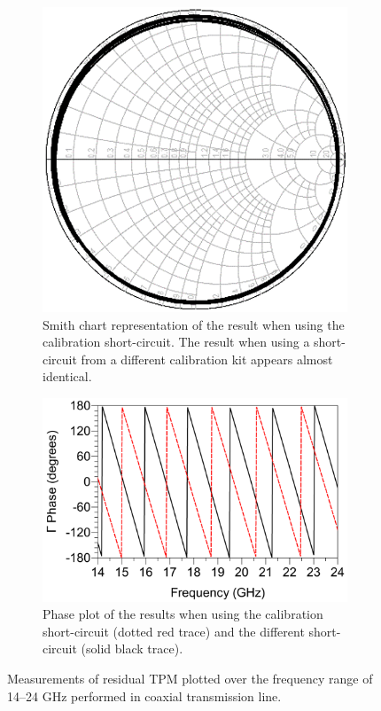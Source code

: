 \documentclass[../thesis/thesis.tex]{subfiles}
\begin{document}
\begin{figure}
	\centering
	\begin{subfigure}{0.37\textwidth}
		\centering
		\includegraphics[width=0.9\linewidth]{tpm-a.png}
		\caption{Smith chart representation of the result when using the calibration short-circuit. The result when using a short-circuit from a different calibration kit appears almost identical.}
	\end{subfigure}\hfill%
	\begin{subfigure}{0.6\textwidth}
		\centering
		\includegraphics[width=0.9\linewidth]{tpm-b.png}
		\caption{Phase plot of the results when using the calibration short-circuit (dotted red trace) and the different short-circuit (solid black trace).}
	\end{subfigure}
	\caption[Measurements of residual TPM performed in coaxial transmission line.]{Measurements of residual TPM plotted over the frequency range of 14--24 GHz performed in coaxial transmission line.}
	\label{ch4_fig_tpm}
\end{figure}
\end{document}
